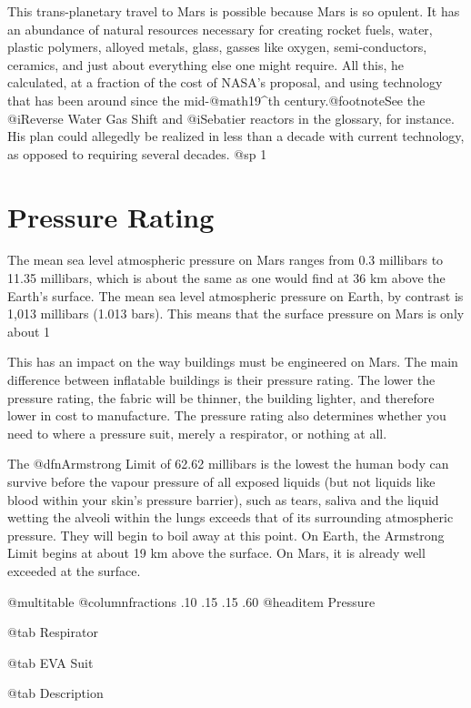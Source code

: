 This trans-planetary travel to Mars is possible because Mars is so opulent. It has an abundance of natural resources necessary for creating rocket fuels, water, plastic polymers, alloyed metals, glass, gasses like oxygen, semi-conductors, ceramics, and just about everything else one might require. All this, he calculated, at a fraction of the cost of NASA's proposal, and using technology that has been around since the mid-@math{19^{th}} century.@footnote{See the @i{Reverse Water Gas Shift} and @i{Sebatier} reactors in the glossary, for instance.} His plan could allegedly be realized in less than a decade with current technology, as opposed to requiring several decades.
@sp 1

\section{Pressure Rating}

The mean sea level atmospheric pressure on Mars ranges from 0.3 millibars to 11.35 millibars, which is about the same as one would find at 36 km above the Earth's surface. The mean sea level atmospheric pressure on Earth, by contrast is 1,013 millibars (1.013 bars). This means that the surface pressure on Mars is only about 1%

This has an impact on the way buildings must be engineered on Mars. The main difference between inflatable buildings is their pressure rating. The lower the pressure rating, the fabric will be thinner, the building lighter, and therefore lower in cost to manufacture. The pressure rating also determines whether you need to where a pressure suit, merely a respirator, or nothing at all.

The @dfn{Armstrong Limit} of 62.62 millibars is the lowest the human body can survive before the vapour pressure of all exposed liquids (but not liquids like blood within your skin's pressure barrier), such as tears, saliva and the liquid wetting the alveoli within the lungs exceeds that of its surrounding atmospheric pressure. They will begin to boil away at this point. On Earth, the Armstrong Limit begins at about 19 km above the surface. On Mars, it is already well exceeded at the surface.

@multitable @columnfractions .10 .15 .15 .60
@headitem Pressure

@tab Respirator

@tab EVA Suit

@tab Description

